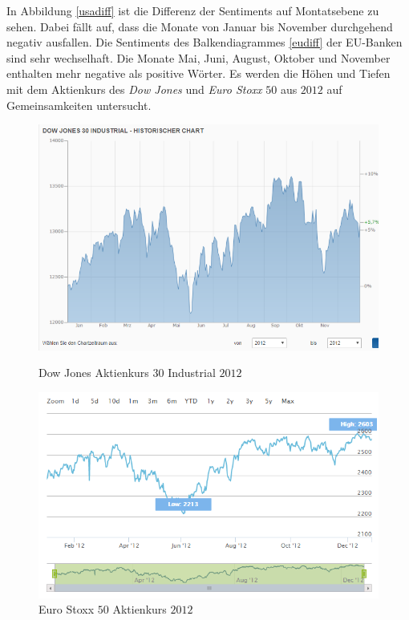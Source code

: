 In Abbildung \ref{usadiff} ist die Differenz der Sentiments auf Montatsebene zu sehen. Dabei fällt auf, dass die Monate von Januar bis November durchgehend negativ ausfallen. Die Sentiments des Balkendiagrammes \ref{eudiff} der EU-Banken sind sehr wechselhaft. Die Monate Mai, Juni, August, Oktober und November enthalten mehr negative als positive Wörter. Es werden die Höhen und Tiefen mit dem Aktienkurs des \textit{Dow Jones} und \textit{Euro Stoxx} $50$ aus $2012$ auf Gemeinsamkeiten untersucht. 
 \begin{figure}[H]
 \begin{minipage}[b]{.4\linewidth} %
 	\includegraphics[width=1\textwidth]{Pictures/DowJones2012.png}
 	\caption{Dow Jones Aktienkurs 30 Industrial $2012$ \cite{Dow}}\label{dowjones}
 \end{minipage}
 \hspace{.2\linewidth}%
 \begin{minipage}[b]{.4\linewidth} %
 	\includegraphics[width=1\textwidth]{Pictures/EuroxStoxx.png}
 	\caption{Euro Stoxx $50$ Aktienkurs $2012$ \cite{eurostoxx}} \label{eustoxx}
 \end{minipage}

\end{figure}
